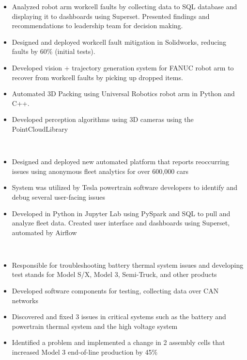     \begin{itemize}
        \item Analyzed robot arm workcell faults by collecting data to SQL database and displaying it to dashboards using Superset. Presented findings and recommendations to leadership team for decision making.
        \item Designed and deployed workcell fault mitigation in Solidworks, reducing faults by 60\% (initial tests).
        \item Developed vision + trajectory generation system for FANUC robot arm to recover from workcell faults by picking up dropped items.
    \end{itemize}
\divider
{}
    \begin{itemize}
        \item Automated 3D Packing using Universal Robotics robot arm in Python and C++.
        \item Developed perception algorithms using 3D cameras using the PointCloudLibrary
    \end{itemize}
\divider\\
    \begin{itemize}
        \item Designed and deployed new automated platform that reports reoccurring issues using anonymous fleet analytics for over 600,000 cars
        \item System was utilized by Tesla powertrain software developers to identify and debug several user-facing issues
        \item Developed in Python in Jupyter Lab using PySpark and SQL to pull and analyze fleet data. Created user interface and dashboards using Superset, automated by Airflow
    \end{itemize}
\divider\\
    \begin{itemize}
        \item Responsible for troubleshooting battery thermal system issues and developing test stands for Model S/X, Model 3, Semi-Truck, and other products
        \item Developed software components for testing, collecting data over CAN networks
        \item Discovered and fixed 3 issues in critical systems such as the battery and powertrain thermal system and the high voltage system
        \item Identified a problem and implemented a change in 2 assembly cells that increased Model 3 end-of-line production by 45\%
    \end{itemize}
